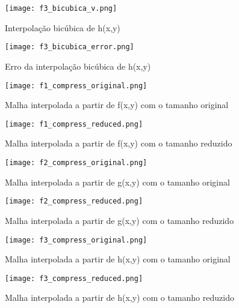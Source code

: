 \documentclass[a4paper, 12pt]{article}
\begin{document}
\begin{figure}[!htp]
\centering
\texttt{[image: f3\_bicubica\_v.png]}
\caption{Interpolação bicúbica de h(x,y)}
\end{figure}

\begin{figure}[!htp]
\centering
\texttt{[image: f3\_bicubica\_error.png]}
\caption{Erro da interpolação bicúbica de h(x,y)}
\end{figure}

\begin{figure}[!htp]
\centering
\texttt{[image: f1\_compress\_original.png]}
\caption{Malha interpolada a partir de f(x,y) com o tamanho original}
\end{figure}

\begin{figure}[!htp]
\centering
\texttt{[image: f1\_compress\_reduced.png]}
\caption{Malha interpolada a partir de f(x,y) com o tamanho reduzido}
\end{figure}

\begin{figure}[!htp]
\centering
\texttt{[image: f2\_compress\_original.png]}
\caption{Malha interpolada a partir de g(x,y) com o tamanho original}
\end{figure}

\begin{figure}[!htp]
\centering
\texttt{[image: f2\_compress\_reduced.png]}
\caption{Malha interpolada a partir de g(x,y) com o tamanho reduzido}
\end{figure}

\begin{figure}[!htp]
\centering
\texttt{[image: f3\_compress\_original.png]}
\caption{Malha interpolada a partir de h(x,y) com o tamanho original}
\end{figure}

\begin{figure}[!htp]
\centering
\texttt{[image: f3\_compress\_reduced.png]}
\caption{Malha interpolada a partir de h(x,y) com o tamanho reduzido}
\end{figure}
\end{document}
